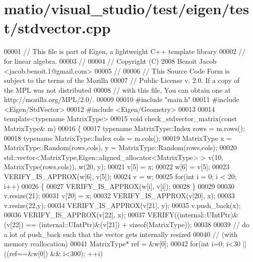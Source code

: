 \hypertarget{matio_2visual__studio_2test_2eigen_2test_2stdvector_8cpp_source}{}\section{matio/visual\+\_\+studio/test/eigen/test/stdvector.cpp}
\label{matio_2visual__studio_2test_2eigen_2test_2stdvector_8cpp_source}

\begin{DoxyCode}
00001 \textcolor{comment}{// This file is part of Eigen, a lightweight C++ template library}
00002 \textcolor{comment}{// for linear algebra.}
00003 \textcolor{comment}{//}
00004 \textcolor{comment}{// Copyright (C) 2008 Benoit Jacob <jacob.benoit.1@gmail.com>}
00005 \textcolor{comment}{//}
00006 \textcolor{comment}{// This Source Code Form is subject to the terms of the Mozilla}
00007 \textcolor{comment}{// Public License v. 2.0. If a copy of the MPL was not distributed}
00008 \textcolor{comment}{// with this file, You can obtain one at http://mozilla.org/MPL/2.0/.}
00009 
00010 \textcolor{preprocessor}{#include "main.h"}
00011 \textcolor{preprocessor}{#include <Eigen/StdVector>}
00012 \textcolor{preprocessor}{#include <Eigen/Geometry>}
00013 
00014 \textcolor{keyword}{template}<\textcolor{keyword}{typename} MatrixType>
00015 \textcolor{keywordtype}{void} check\_stdvector\_matrix(\textcolor{keyword}{const} MatrixType& m)
00016 \{
00017   \textcolor{keyword}{typename} MatrixType::Index rows = m.rows();
00018   \textcolor{keyword}{typename} MatrixType::Index cols = m.cols();
00019   MatrixType x = MatrixType::Random(rows,cols), y = MatrixType::Random(rows,cols);
00020   std::vector<MatrixType,Eigen::aligned\_allocator<MatrixType> > v(10, MatrixType(rows,cols)), w(20, y);
00021   v[5] = x;
00022   w[6] = v[5];
00023   VERIFY\_IS\_APPROX(w[6], v[5]);
00024   v = w;
00025   \textcolor{keywordflow}{for}(\textcolor{keywordtype}{int} i = 0; i < 20; i++)
00026   \{
00027     VERIFY\_IS\_APPROX(w[i], v[i]);
00028   \}
00029 
00030   v.resize(21);
00031   v[20] = x;
00032   VERIFY\_IS\_APPROX(v[20], x);
00033   v.resize(22,y);
00034   VERIFY\_IS\_APPROX(v[21], y);
00035   v.push\_back(x);
00036   VERIFY\_IS\_APPROX(v[22], x);
00037   VERIFY((internal::UIntPtr)&(v[22]) == (internal::UIntPtr)&(v[21]) + \textcolor{keyword}{sizeof}(MatrixType));
00038 
00039   \textcolor{comment}{// do a lot of push\_back such that the vector gets internally resized}
00040   \textcolor{comment}{// (with memory reallocation)}
00041   MatrixType* ref = &w[0];
00042   \textcolor{keywordflow}{for}(\textcolor{keywordtype}{int} i=0; i<30 || ((ref==&w[0]) && i<300); ++i)

\end{DoxyCode}
